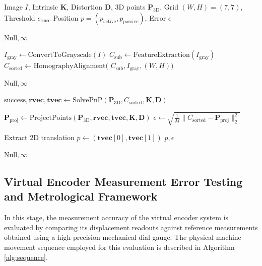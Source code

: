 \begin{algorithm}[t]
\caption{Virtual Encoder Workflow}
\label{alg:pose_extraction}
\begin{algorithmic}[1]
\footnotesize

\Require Image $I$, Intrinsic $\mathbf{K}$, Distortion $\mathbf{D}$, 3D points $\mathbf{P}_{3\text{D}}$,
\Statex \hspace{2.5em} Grid $(W, H) = (7, 7)$, Threshold $\epsilon_{\text{rmse}}$
\Ensure Position $p = (p_{\text{active}}, p_{\text{passive}})$, Error $\epsilon$

        \State \Return $\text{Null}, \infty$ 
    \EndIf

    \State $I_{\text{gray}} \gets \text{ConvertToGrayscale}(I)$
    \State $C_{\text{sub}} \gets \text{FeatureExtraction}(I_{\text{gray}})$
    \State $C_{\text{sorted}} \gets \text{HomographyAlignment}($
    \Statex \hspace{5.5em} $C_{\text{sub}}, I_{\text{gray}}, (W, H))$

        \State \Return $\text{Null}, \infty$
    \EndIf

    \State $\text{success}, \mathbf{rvec}, \mathbf{tvec} \gets \text{SolvePnP}(\mathbf{P}_{3\text{D}}, C_{\text{sorted}}, \mathbf{K}, \mathbf{D})$

        \State $\mathbf{P}_{\text{proj}} \gets \text{ProjectPoints}(\mathbf{P}_{3\text{D}}, \mathbf{rvec}, \mathbf{tvec}, \mathbf{K}, \mathbf{D})$
        \State $\epsilon \gets \sqrt{\frac{1}{M} \|C_{\text{sorted}} - \mathbf{P}_{\text{proj}}\|_2^2}$

            \State Extract 2D translation $p \gets (\mathbf{tvec}[0], \mathbf{tvec}[1])$
            \State \Return $p, \epsilon$
        \EndIf
    \EndIf

    \State \Return $\text{Null}, \infty$
\EndFunction

\end{algorithmic}
\end{algorithm}

\subsection{Virtual Encoder Measurement Error Testing and Metrological Framework}
In this stage, the measurement accuracy of the virtual encoder system is evaluated by comparing its displacement readouts against reference measurements obtained using a high-precision mechanical dial gauge. The physical machine movement sequence employed for this evaluation is described in Algorithm \ref{alg:sequence}.

